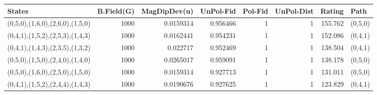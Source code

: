 \begin{tabular}{lrrrrrrl}
\hline
 States                          &   B.Field(G) &   MagDipDev(u) &   UnPol-Fid &   Pol-Fid &   UnPol-Dist &   Rating & Path    \\
\hline
 (0,5,0),(1,6,0),(2,6,0),(1,5,0) &         1000 &      0.0159314 &    0.956466 &         1 &            1 &  155.762 & (0,5,0) \\
 (0,4,1),(1,5,2),(2,5,3),(1,4,3) &         1000 &      0.0162441 &    0.954231 &         1 &            1 &  152.086 & (0,4,1) \\
 (0,4,1),(1,4,3),(2,3,5),(1,3,2) &         1000 &      0.022717  &    0.952469 &         1 &            1 &  138.504 & (0,4,1) \\
 (0,5,0),(1,5,0),(2,4,0),(1,4,0) &         1000 &      0.0265017 &    0.959091 &         1 &            1 &  138.178 & (0,5,0) \\
 (0,5,0),(1,6,0),(2,5,0),(1,5,0) &         1000 &      0.0159314 &    0.927713 &         1 &            1 &  131.011 & (0,5,0) \\
 (0,4,1),(1,5,2),(2,4,4),(1,4,3) &         1000 &      0.0190676 &    0.927625 &         1 &            1 &  123.829 & (0,4,1) \\
\hline
\end{tabular}